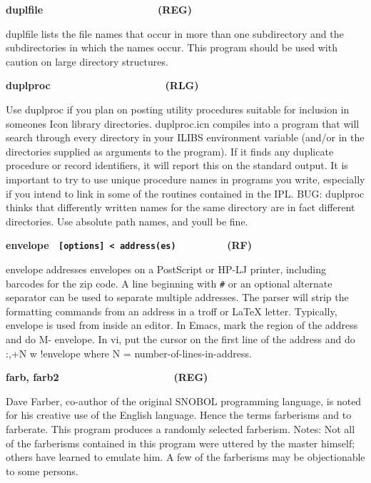 {\sffamily\bfseries
duplfile\ \ \ \ \ \ \ \ \ \ \ \ \ \ \ \ \ \ \ \ (REG)}

\textsf{duplfile} lists the file names that occur in more than one
subdirectory and the subdirectories in which the names occur. This
program should be used with caution on large directory structures.

{\sffamily\bfseries
duplproc\ \ \ \ \ \ \ \ \ \ \ \ \ \ \ \ \ \ \ \ (RLG)}

Use \textsf{duplproc} if you plan on posting utility procedures suitable
for inclusion in someone{\textquotesingle}s Icon library directories.
duplproc.icn compiles into a program that will search through every
directory in your ILIBS environment
variable (and/or in the directories supplied as arguments to the
program). If it finds any duplicate procedure or record identifiers, it
will report this on the standard output. It is important to try to use
unique procedure names in programs you write, especially if you intend
to link in some of the routines contained in the IPL. BUG: duplproc
thinks that differently written names for the same directory are in
fact different directories. Use absolute path names, and
you{\textquotesingle}ll be fine.

{\sffamily\bfseries
envelope \ \texttt{\textmd{[options] {\textless}
address(es)\ \ \ \ \ \ \ \ \ \  }}(RF)}

\textsf{envelope} addresses envelopes on a PostScript
or HP-LJ printer, including barcodes for the zip code. A line beginning
with \texttt{\#} or an optional alternate separator can be used to
separate multiple addresses. The parser will strip the formatting
commands from an address in a troff or LaTeX letter. Typically,
\textsf{envelope} is used from inside an editor. In
Emacs, mark the region of the address and do \textsf{M-{\textbar}
envelope}. In vi, put the cursor on the first line of the address and
do \textsf{:,+N w !envelope} where N = number-of-lines-in-address.

{\sffamily\bfseries
farb, farb2\ \ \ \ \ \ \ \ \ \ \ \ \ \ \ \ \ \ \ \ (REG)}

Dave Farber, co-author of the original SNOBOL
programming language, is noted for his creative use of the English
language. Hence the terms {\textquotedbl}farberisms{\textquotedbl} and
{\textquotedbl}to farberate{\textquotedbl}. This program produces a
randomly selected farberism. Notes: Not all of the farberisms contained
in this program were uttered by the master himself; others have learned
to emulate him. A few of the farberisms may be objectionable to some
persons.

